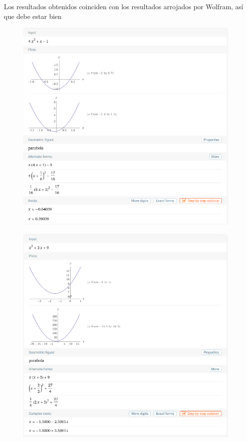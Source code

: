 \documentclass[12pt,a4paper]{article}
\begin{document}
\begin{enumerate}
    
    Los resultados obtenidos coinciden con los resultados arrojados por Wolfram, así que debe estar bien
    
    \begin{figure}
        \centering
        \includegraphics[scale = 0.5]{1.1.PNG}
    \end{figure}
    
    \newpage
    
    \begin{figure}
        \centering
        \includegraphics[scale = 0.5]{1.2.2.PNG}
    \end{figure}
    

\end{enumerate}
\end{document}
